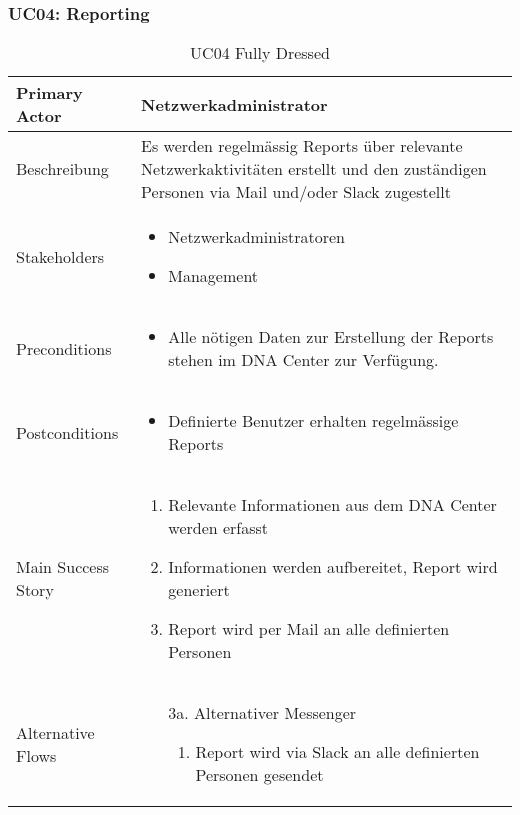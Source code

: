 \subsubsection{UC04: Reporting}
\begin{table}[H]
	\centering
	\begin{tabularx}{\textwidth}{l | X}
		Primary Actor   & Netzwerkadministrator        \\
		\hline
		Beschreibung   & Es werden regelmässig Reports über relevante Netzwerkaktivitäten erstellt und den zuständigen Personen via Mail und/oder Slack zugestellt  \\ 
		\hline
		Stakeholders       & 
		\begin{itemize}
			\item Netzwerkadministratoren
			\item Management
		\end{itemize} \\ 
		Preconditions      &
		\begin{itemize}	
			\item Alle nötigen Daten zur Erstellung der Reports stehen im DNA Center zur Verfügung.
		\end{itemize}  \\
		\hline
		Postconditions     & 
		\begin{itemize}	
			\item Definierte Benutzer erhalten regelmässige Reports
		\end{itemize}  \\
		\hline
		Main Success Story & 
		\begin{enumerate}
			\item Relevante Informationen aus dem DNA Center werden erfasst
			\item Informationen werden aufbereitet, Report wird generiert
			\item Report wird per Mail an alle definierten Personen
		\end{enumerate}
		\\
		\hline
		Alternative Flows  & 
		\begin{itemize}
			\item[3a.] Alternativer Messenger
			\begin{enumerate}
				\item Report wird via Slack an alle definierten Personen gesendet
			\end{enumerate}
		\end{itemize}
	\end{tabularx}
	\caption{UC04 Fully Dressed}
	\label{tab:UC04}
\end{table}

